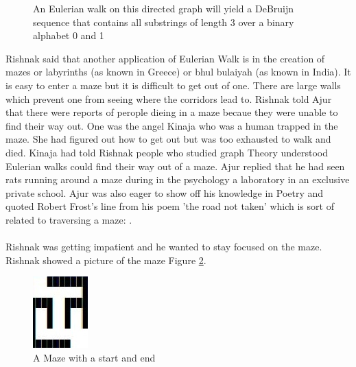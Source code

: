 \begin{figure}
\begin{center}
\caption{ An Eulerian walk on this directed graph will yield a DeBruijn sequence that contains all substrings of length 3 over a binary alphabet 0 and 1}\label{4g6}
\end{center}
\end{figure}
\vspace{0.3in}
\noindent
Rishnak said that another application of Eulerian Walk is in the creation of mazes or labyrinths (as known in Greece) or bhul bulaiyah (as known in India).  It is easy to enter a maze but it is difficult to get out of one. There are large walls which prevent one from seeing where the corridors lead to. Rishnak told Ajur that there were reports of perople  dieing in a maze becaue they were unable to find their way out. One was the angel Kinaja who was a human trapped in the maze. She had figured out how to get out but was too exhausted to walk and died. Kinaja had told Rishnak people who studied graph Theory understood Eulerian walks could find their way out of a maze. Ajur replied that he had seen rats running around a maze during in the psychology a laboratory in an exclusive private school. Ajur was also eager to show off his knowledge in Poetry and quoted Robert Frost's line from his poem 'the road not taken' which is sort of related to traversing a maze: . 
\\
\\
\noindent Rishnak was getting impatient and he wanted to stay focused on the maze. Rishnak showed a picture of the maze Figure \ref{4g7}.
\begin{figure}
\begin{center}
\includegraphics{maze1.JPG}
\caption{A Maze with a start and end}\label{4g7}
\end{center}
\end{figure}

